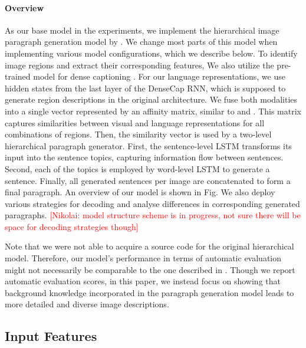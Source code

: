 \documentclass[11pt,a4paper]{article}
\newcommand{\kibitz}[2]{\ifnum\Comments=1\textcolor{#1}{#2}\fi}
\newcommand{\nikolai}[1]{\kibitz{red}      {[Nikolai: #1]}}
\begin{document}
\paragraph{Overview}
As our base model in the experiments, we implement the hierarchical image paragraph generation model by \cite{krause2016hierarchical}.
We change most parts of this model when implementing various model configurations, which we describe below.
To identify image regions and extract their corresponding features,
We also utilize the pre-trained model for dense captioning \cite{densecap}.
For our language representations, we use hidden states from the last layer of the DenseCap RNN, which is supposed to generate region descriptions in the original architecture.
We fuse both modalities into a single vector represented by an affinity matrix, similar to  and .
This matrix captures similarities between visual and language representations for all combinations of regions.
Then, the similarity vector is used by a two-level hierarchical paragraph generator.
First, the sentence-level LSTM transforms its input into the sentence topics, capturing information flow between sentences.
Second, each of the topics is employed by word-level LSTM to generate a sentence.
Finally, all generated sentences per image are concatenated to form a final paragraph. An overview of our model is shown in Fig.
We also deploy various strategies for decoding and analyse differences in corresponding generated paragraphs.
\nikolai{model structure scheme is in progress, not sure there will be space for decoding strategies though}

Note that we were not able to acquire a source code for the original hierarchical model.
Therefore, our model's performance in terms of automatic evaluation might not necessarily be comparable to the one described in .
Though we report automatic evaluation scores, in this paper, we instead focus on showing that background knowledge incorporated in the paragraph generation model leads to more detailed and diverse image descriptions.

\subsection{Input Features}
\end{document}
